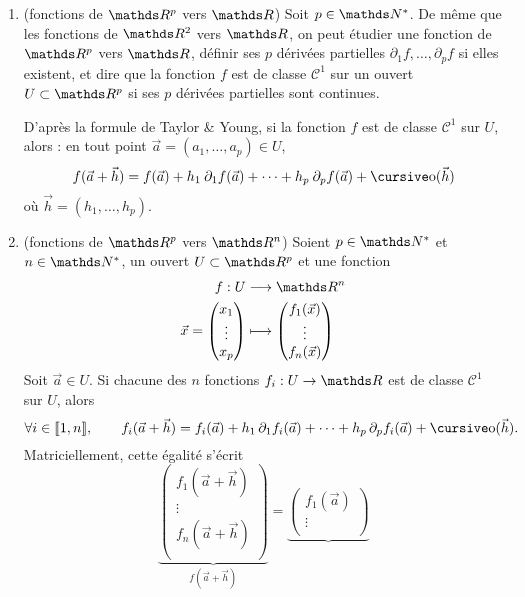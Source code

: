\begin{rmk}
	\begin{enumerate}
		\item (fonctions de $\R^p$ vers $\R$) Soit $p \in \N^*$. De même que les fonctions de $\R^2$ vers $\R$, on peut étudier une fonction de $\R^p$ vers $\R$, définir ses $p$ dérivées partielles $\partial_1 f,\ldots, \partial_p f$ si elles existent, et dire que la fonction $f$ est de classe $\mathcal{C}^1$ sur un ouvert $U \subset \R^p$ si ses $p$ dérivées partielles sont continues.
			
			D'après la formule de Taylor \& Young, si la fonction $f$ est de classe $\mathcal{C}^1$ sur $U$, alors : en tout point $\vec{a} = (a_1, \ldots, a_p) \in U$, \[
				f(\vec{a}+\vec{h}) = f(\vec{a}) + h_1\: \partial_1 f(\vec{a}) + \cdots + h_p \: \partial_p f(\vec{a}) + \po(\vec{h})
			\] où $\vec{h} = (h_1, \ldots, h_p)$.
		\item (fonctions de $\R^p$ vers $\R^n$) Soient $p \in \N^*$ et $n \in \N^*$, un ouvert $U \subset \R^p$ et une fonction \begin{align*}
				f: U &\longrightarrow \R^n \\
				\vec{x} = \begin{pmatrix}
					x_1\\
					\vdots\\
					x_p
				\end{pmatrix} &\longmapsto \begin{pmatrix}
					f_1(\vec{x})\\
					\vdots\\
					f_n(\vec{x})
				\end{pmatrix}
			\end{align*}
			Soit $\vec{a} \in U$. Si chacune des $n$ fonctions $f_i : U \to \R$ est de classe $\mathcal{C}^1$ sur $U$, alors \[
				\forall i \in \llbracket 1,n \rrbracket,\quad\quad f_i(\vec{a} + \vec{h}) = f_i(\vec{a}) + h_1\,\partial_1 f_i(\vec{a}) + \cdots + h_p\,\partial_p f_i(\vec{a}) + \po(\vec{h})
			.\]
			Matriciellement, cette égalité s'écrit \[
				\underbrace{\begin{pmatrix}
					 f_1(\vec{a} + \vec{h})\\
					 \vdots\\
					 f_n(\vec{a} + \vec{h})\\
				\end{pmatrix}}_{f(\vec{a} + \vec{h})}
				=
				\underbrace{
				\begin{pmatrix}
					f_1(\vec{a})\\
					\vdots\\

\end{pmatrix}}\]
\end{enumerate}
\end{rmk}
